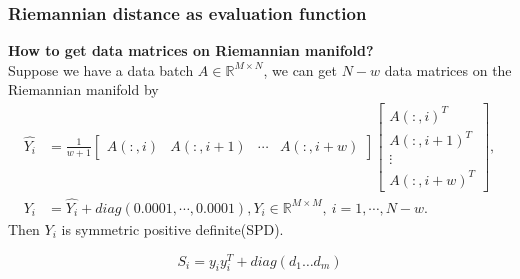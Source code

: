 \documentclass[10pt]{beamer}
\begin{document}
\begin{frame}
\frametitle{Riemannian distance as evaluation function}
    \textbf{How to get data matrices on Riemannian manifold?}\\
 Suppose we have a data batch $A \in \mathbb{R}^{M \times N}$, we can get $N-w$ data matrices on the Riemannian manifold by 
 \begin{equation}
    \begin{split}
    \hat{Y_i} &=\frac{1}{w+1} 
    \begin{bmatrix}
    A(:,i) & A(:,i+1) & \cdots & A(:,i+w)
    \end{bmatrix}
    \begin{bmatrix}
        A(:,i)^T \\ A(:,i+1)^T \\ \vdots \\ A(:,i+w)^T
    \end{bmatrix},\\
    Y_i &= \hat{Y_i}  + diag(0.0001,\cdots, 0.0001), Y_i \in \mathbb{R}^{M \times M} ,\  i = 1,\cdots , N-w.
 \label{eq:SPD}
\end{split}
 \end{equation}
Then $Y_i$ is symmetric positive definite(SPD).

      \begin{equation}
              S_i = y_iy_i^T+diag(d_1 \dots d_m)
    \end{equation}
\end{frame}
\end{document}
